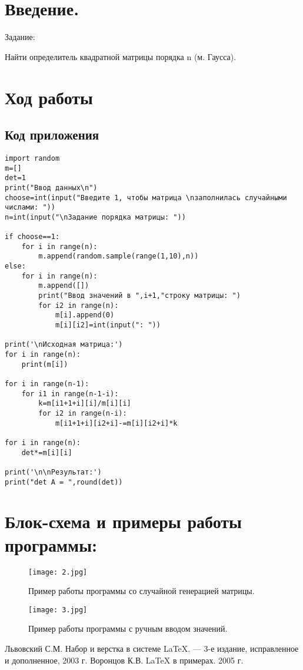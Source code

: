 \documentclass[12pt,a4paper]{scrartcl}
\begin{document}
\section{Введение.}
\label{sec:intro}
Задание:
\begin{description}
    Найти определитель квадратной матрицы порядка n (м. Гаусса).
\end{description}
\section{Ход работы}
\label{sec:exp}
\subsection{Код приложения}
\label{sec:exp:code}
\begin{verbatim}
import random
m=[]
det=1
print("Ввод данных\n")
choose=int(input("Введите 1, чтобы матрица \nзаполнилась случайными числами: "))
n=int(input("\nЗадание порядка матрицы: "))

if choose==1: 
    for i in range(n):
        m.append(random.sample(range(1,10),n))
else:
    for i in range(n):
        m.append([])
        print("Ввод значений в ",i+1,"строку матрицы: ")
        for i2 in range(n):
            m[i].append(0)
            m[i][i2]=int(input(": "))

print('\nИсходная матрица:') 
for i in range(n):
    print(m[i])

for i in range(n-1): 
    for i1 in range(n-1-i):
        k=m[i1+1+i][i]/m[i][i]
        for i2 in range(n-i):
            m[i1+1+i][i2+i]-=m[i][i2+i]*k

for i in range(n):
    det*=m[i][i]

print('\n\nРезультат:') 
print("det A = ",round(det))
\end{verbatim}
\section{Блок-схема и примеры работы программы:}
\label{sec:pictures}
\begin{figure}[h]
	\centering
	\texttt{[image: 2.jpg]}
	\caption{Пример работы программы со случайной генерацией матрицы.}\label{fig:par}
\end{figure}
\begin{figure}[h]
	\centering
	\texttt{[image: 3.jpg]}
	\caption{Пример работы программы с ручным вводом значений.}\label{fig:par}
\end{figure}





\begin{thebibliography}{9}
Львовский С.М. Набор и верстка в системе \LaTeX{}. \newblock --- 3-е издание, исправленное и дополненное, 2003 г.
Воронцов К.В. \LaTeX{} в примерах. 2005 г.
\end{thebibliography}
\end{document}
